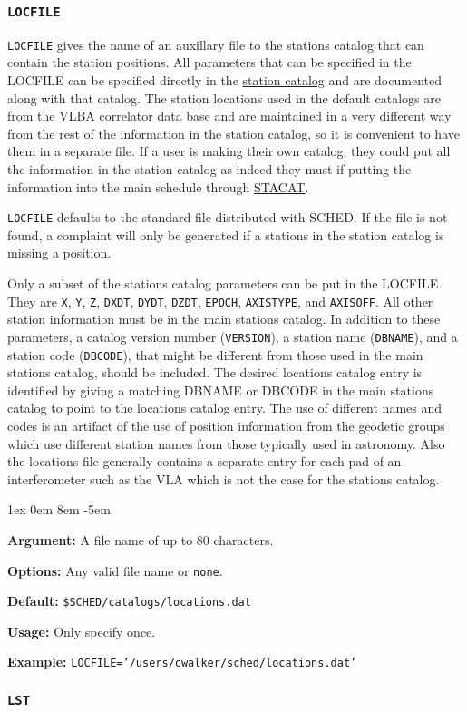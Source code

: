 \documentclass{report}
\newcommand{\sched}{{\sc SCHED}}
\newcommand{\rcwbox}[5]{
  \begin{list}{}{\parsep 1ex  \itemsep 0em
                 \leftmargin 8em  \itemindent -5em }
    \item {\bf Argument:} #1
    \item {\bf Options:}  #2
    \item {\bf Default:}  #3
    \item {\bf Usage:}    #4
    \item {\bf Example:}  #5
  \end{list}
}
\begin{document}
\subsubsection{\label{MP:LOCFILE}{\tt LOCFILE}}

{\tt LOCFILE} gives the name of an auxillary file to the stations
catalog that can contain the station positions.  All parameters that
can be specified in the LOCFILE can be specified directly in the
{\hyperref[SEC:STACAT]{station catalog}} and are documented along with
that catalog.  The station locations used in the default catalogs are
from the VLBA correlator data base and are maintained in a very
different way from the rest of the information in the station
catalog, so it is convenient to have them in a separate file.  If
a user is making their own catalog, they could put all the
information in the station catalog as indeed they must if putting
the information into the main schedule through 
{\hyperref[MP:STACAT]{STACAT}}.

{\tt LOCFILE} defaults to the standard file distributed with
\sched.  If the file is not found, a complaint will only be
generated if a stations in the station catalog is missing
a position.

Only a subset of the stations catalog parameters can be put in the
LOCFILE.  They are {\tt X}, {\tt Y}, {\tt Z}, {\tt DXDT}, {\tt DYDT},
{\tt DZDT}, {\tt EPOCH}, {\tt AXISTYPE}, and {\tt AXISOFF}.  All other
station information must be in the main stations catalog.  In addition
to these parameters, a catalog version number ({\tt VERSION}), a
station name ({\tt DBNAME}), and a station code ({\tt DBCODE}), that
might be different from those used in the main stations catalog,
should be included.  The desired locations catalog entry is identified
by giving a matching DBNAME or DBCODE in the main stations catalog to
point to the locations catalog entry.  The use of different names and
codes is an artifact of the use of position information from the
geodetic groups which use different station names from those typically
used in astronomy.  Also the locations file generally contains a
separate entry for each pad of an interferometer such as the VLA which
is not the case for the stations catalog.

\rcwbox
{A file name of up to 80 characters.}
{Any valid file name or {\tt none}.}
{{\tt \$SCHED/catalogs/locations.dat}}
{Only specify once.}
{{\tt LOCFILE='/users/cwalker/sched/locations.dat'}}

\subsubsection{\label{MP:LST}{\tt LST}}
\end{document}
